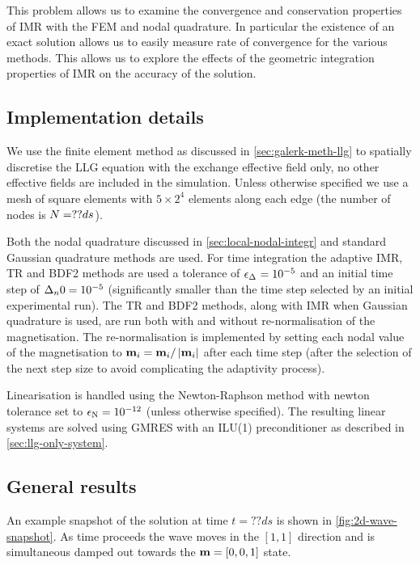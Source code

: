 This problem allows us to examine the convergence and conservation properties of IMR with the FEM and nodal quadrature.
In particular the existence of an exact solution allows us to easily measure rate of convergence for the various methods.
This allows us to explore the effects of the geometric integration properties of IMR on the accuracy of the solution.


\subsection{Implementation details}

We use the finite element method as discussed in \cref{sec:galerk-meth-llg} to spatially discretise the LLG equation with the exchange effective field only, no other effective fields are included in the simulation.
Unless otherwise specified we use a mesh of square elements with $5 \times 2^4$ elements along each edge (\ie the number of nodes is $N = ??ds$).

Both the nodal quadrature discussed in \cref{sec:local-nodal-integr} and standard Gaussian quadrature methods are used.
For time integration the adaptive IMR, TR and BDF2 methods are used a tolerance of $\epsilon_{\Delta_{}} = 10^{-5}$ and an initial time step of $\Delta_{n}{0} = 10^{-5}$ (significantly smaller than the time step selected by an initial experimental run).
The TR and BDF2 methods, along with IMR when Gaussian quadrature is used, are run both with and without re-normalisation of the magnetisation.
The re-normalisation is implemented by setting each nodal value of the magnetisation to $\boldsymbol{\mathrm{m}}_i = \boldsymbol{\mathrm{m}}_i/\left|{\boldsymbol{\mathrm{m}}_i} \right|$ after each time step (after the selection of the next step size to avoid complicating the adaptivity process).

Linearisation is handled using the Newton-Raphson method with newton tolerance set to $\epsilon_{\mathrm{N}} = 10^{-12}$ (unless otherwise specified).
The resulting linear systems are solved using GMRES with an ILU(1) preconditioner as described in \cref{sec:llg-only-system}.


\subsection{General results}

An example snapshot of the solution at time $t=??ds$ is shown in \cref{fig:2d-wave-snapshot}.
As time proceeds the wave moves in the $[1,1]$ direction and is simultaneous damped out towards the $\boldsymbol{\mathrm{m}} = [0,0,1]$ state.

